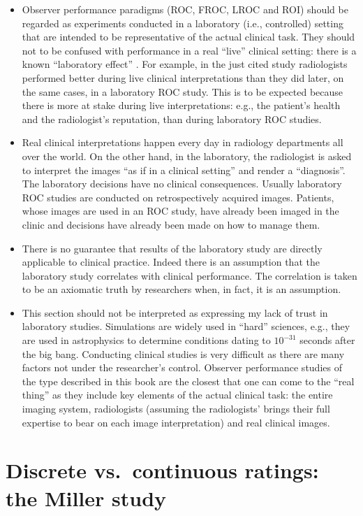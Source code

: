\documentclass[
]{book}
\begin{document}
\begin{itemize}
\item
  Observer performance paradigms (ROC, FROC, LROC and ROI) should be regarded as experiments conducted in a laboratory (i.e., controlled) setting that are intended to be representative of the actual clinical task. They should not to be confused with performance in a real ``live'' clinical setting: there is a known ``laboratory effect'' \citep{RN2026}. For example, in the just cited study radiologists performed better during live clinical interpretations than they did later, on the same cases, in a laboratory ROC study. This is to be expected because there is more at stake during live interpretations: e.g., the patient's health and the radiologist's reputation, than during laboratory ROC studies.
\item
  Real clinical interpretations happen every day in radiology departments all over the world. On the other hand, in the laboratory, the radiologist is asked to interpret the images ``as if in a clinical setting'' and render a ``diagnosis''. The laboratory decisions have no clinical consequences. Usually laboratory ROC studies are conducted on retrospectively acquired images. Patients, whose images are used in an ROC study, have already been imaged in the clinic and decisions have already been made on how to manage them.
\item
  There is no guarantee that results of the laboratory study are directly applicable to clinical practice. Indeed there is an assumption that the laboratory study correlates with clinical performance. The correlation is taken to be an axiomatic truth by researchers when, in fact, it is an assumption.
\item
  This section should not be interpreted as expressing my lack of trust in laboratory studies. Simulations are widely used in ``hard'' sciences, e.g., they are used in astrophysics to determine conditions dating to \(10^{-31}\) seconds after the big bang. Conducting clinical studies is very difficult as there are many factors not under the researcher's control. Observer performance studies of the type described in this book are the closest that one can come to the ``real thing'' as they include key elements of the actual clinical task: the entire imaging system, radiologists (assuming the radiologists' brings their full expertise to bear on each image interpretation) and real clinical images.
\end{itemize}

\hypertarget{binary-task-discrete-vs-continuous-ratings}{%
\section{Discrete vs.~continuous ratings: the Miller study}\label{binary-task-discrete-vs-continuous-ratings}}
\end{document}
